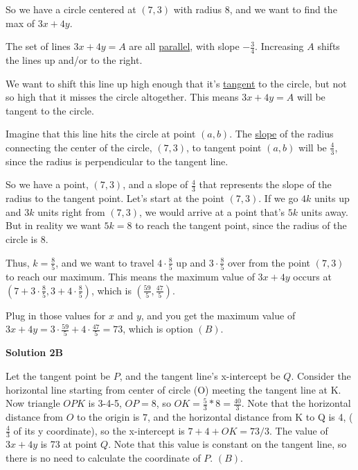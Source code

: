 \begin{enumerate}
 So we have a circle centered at $(7,3)$ with radius $8$, and we want to find the max of $3x + 4y$.

 The set of lines $3x + 4y = A$ are all \href{https://artofproblemsolving.com/wiki/index.php?title=Parallel}{parallel}, with slope $-\frac{3}{4}$.  Increasing $A$ shifts the lines up and/or to the right.

 We want to shift this line up high enough that it's \href{https://artofproblemsolving.com/wiki/index.php?title=Tangent\_(geometry)}{tangent} to the circle, but not so high that it misses the circle altogether.  This means $3x + 4y = A$ will be tangent to the circle.

 Imagine that this line hits the circle at point $(a,b)$.  The \href{https://artofproblemsolving.com/wiki/index.php?title=Slope}{slope} of the radius connecting the center of the circle, $(7,3)$, to tangent point $(a,b)$ will be $\frac{4}{3}$, since the radius is perpendicular to the tangent line.

 So we have a point, $(7,3)$, and a slope of $\frac{4}{3}$ that represents the slope of the radius to the tangent point.  Let's start at the point $(7,3)$.  If we go $4k$ units up and $3k$ units right from $(7,3)$, we would arrive at a point that's $5k$ units away.  But in reality we want $5k = 8$ to reach the tangent point, since the radius of the circle is $8$.

 Thus, $k = \frac{8}{5}$, and we want to travel $4\cdot \frac{8}{5}$ up and $3\cdot \frac{8}{5}$ over from the point $(7,3)$ to reach our maximum.  This means the maximum value of $3x + 4y$ occurs at $\left(7 +3\cdot \frac{8}{5}, 3 + 4\cdot \frac{8}{5}\right)$, which is $\left(\frac{59}{5}, \frac{47}{5}\right).$

 Plug in those values for $x$ and $y$, and you get the maximum value of $3x + 4y = 3\cdot\frac{59}{5} + 4\cdot\frac{47}{5} = \boxed{73}$, which is option $\boxed{(B)}$.

 



\textbf{Solution 2B}

Let the tangent point be $P$, and the tangent line's x-intercept be $Q$. Consider the horizontal line starting from center of circle (O) meeting the tangent line at K. Now triangle $OPK$ is 3-4-5, $OP=8$, so $OK = \frac{5}{3}*8 = \frac{40}{3}$. Note that the horizontal distance from $O$ to the origin is $7$, and the horizontal distance from K to Q is 4, ($\frac{4}{3}$ of its y coordinate), so the x-intercept is $7+4+OK = 73/3$. The value of $3x+4y$ is 73 at point $Q$. Note that this value is constant on the tangent line, so there is no need to calculate the coordinate of $P$. $\boxed{(B)}$.


\end{enumerate}
